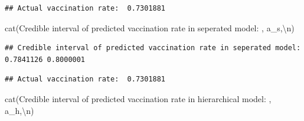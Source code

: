 \documentclass[
]{article}
\newenvironment{Shaded}{\begin{snugshade}}{\end{snugshade}}
\newcommand{\AttributeTok}[1]{\textcolor[rgb]{0.77,0.63,0.00}{#1}}
\newcommand{\CommentTok}[1]{\textcolor[rgb]{0.56,0.35,0.01}{\textit{#1}}}
\newcommand{\DecValTok}[1]{\textcolor[rgb]{0.00,0.00,0.81}{#1}}
\newcommand{\FloatTok}[1]{\textcolor[rgb]{0.00,0.00,0.81}{#1}}
\newcommand{\FunctionTok}[1]{\textcolor[rgb]{0.00,0.00,0.00}{#1}}
\newcommand{\NormalTok}[1]{#1}
\newcommand{\OtherTok}[1]{\textcolor[rgb]{0.56,0.35,0.01}{#1}}
\newcommand{\SpecialCharTok}[1]{\textcolor[rgb]{0.00,0.00,0.00}{#1}}
\newcommand{\StringTok}[1]{\textcolor[rgb]{0.31,0.60,0.02}{#1}}
\begin{document}
\begin{verbatim}
## Actual vaccination rate:  0.7301881
\end{verbatim}

\begin{Shaded}
\begin{Highlighting}[]
\FunctionTok{cat}\NormalTok{(}\StringTok{\textquotesingle{}Credible interval of predicted vaccination rate in seperated model: \textquotesingle{}}\NormalTok{,}
\NormalTok{    a\_s,}\StringTok{\textquotesingle{}}\SpecialCharTok{\textbackslash{}n}\StringTok{\textquotesingle{}}\NormalTok{)}
\end{Highlighting}
\end{Shaded}

\begin{verbatim}
## Credible interval of predicted vaccination rate in seperated model:  0.7841126 0.8000001
\end{verbatim}

\begin{Shaded}
\end{Shaded}

\begin{verbatim}
## Actual vaccination rate:  0.7301881
\end{verbatim}

\begin{Shaded}
\begin{Highlighting}[]
\FunctionTok{cat}\NormalTok{(}\StringTok{\textquotesingle{}Credible interval of predicted vaccination rate in hierarchical model: \textquotesingle{}}\NormalTok{,}
\NormalTok{    a\_h,}\StringTok{\textquotesingle{}}\SpecialCharTok{\textbackslash{}n}\StringTok{\textquotesingle{}}\NormalTok{)}
\end{Highlighting}
\end{Shaded}
\end{document}
